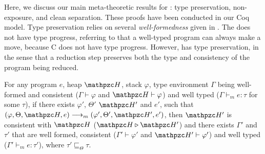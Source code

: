 %  
%  
%  
%  


Here, we discuss our main meta-theoretic results for
\lang: type preservation,
non-exposure, and clean separation.
These proofs have been conducted in our Coq model.
Type preservation relies on several \emph{well-formedness} given in .
The \lang does not have type progress, referring to that a well-typed program can always make a move, 
because C does not have type progress.
However, \lang has type preservation, in the sense that a reduction step preserves both the
type and consistency of the program being reduced.

\begin{thm}
For any \lang program $e$, heap $\heap$, stack
$\varphi$, type environment $\Gamma$ being well-formed and consistent
($\Gamma\vdash \varphi$ and $\heap \vdash \varphi$) and well
typed ($\Gamma\vdash_{m} e : \tau$ for some $\tau$), if there exists $\varphi'$, $\Theta'$
$\heap'$ and $e'$, such that $(\varphi,\Theta,\heap,e)
\longrightarrow_{m} (\varphi',\Theta',\heap',e')$, then $\heap'$ is
consistent with $\heap$ ($\heap \triangleright \heap'$) and there exists
$\Gamma'$ and $\tau'$ that are well formed, consistent
($\Gamma'\vdash \varphi'$ and $\heap' \vdash \varphi'$) and
well typed ($\Gamma' \vdash_{m} e: \tau'$), where
$\tau'\sqsubseteq_{\Theta} \tau$.
\end{thm}

